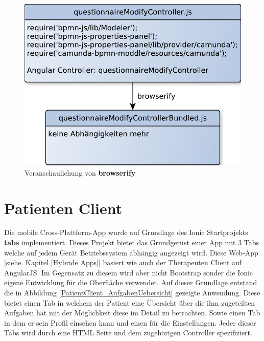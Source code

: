 \begin{figure}[H]
	\centering
	\includegraphics[scale=0.7]{images/browserifyErlauterung}
	\caption[Veranschaulichung von \textbf{browserify}]{Veranschaulichung von \textbf{browserify}}
	\label{browserifyErlauterung}
\end{figure}

\section{Patienten Client}
Die mobile Cross-Plattform-App wurde auf Grundlage des Ionic Startprojekts \textbf{tabs} implementiert. Dieses Projekt bietet das Grundgerüst einer App mit 3 Tabs welche auf jedem Gerät Betriebssystem abhängig angezeigt wird. Diese Web-App [siehe. Kapitel \ref{Hybride Apps}] basiert wie auch der Therapeuten Client auf AngularJS. Im Gegensatz zu diesem wird aber nicht Bootstrap sonder die Ionic eigene Entwicklung für die Oberfläche verwendet. Auf dieser Grundlage entstand die in Abbildung \ref{PatientClient_AufgabenUebersicht} gezeigte Anwendung. Diese bietet einen Tab in welchem der Patient eine Übersicht über die ihm zugeteilten Aufgaben hat mit der Möglichkeit diese im Detail zu betrachten. Sowie einen Tab in dem er sein Profil einsehen kann und einen für die Einstellungen. Jeder dieser Tabs wird durch eine HTML Seite und dem zugehörigen Controller spezifiziert. 

